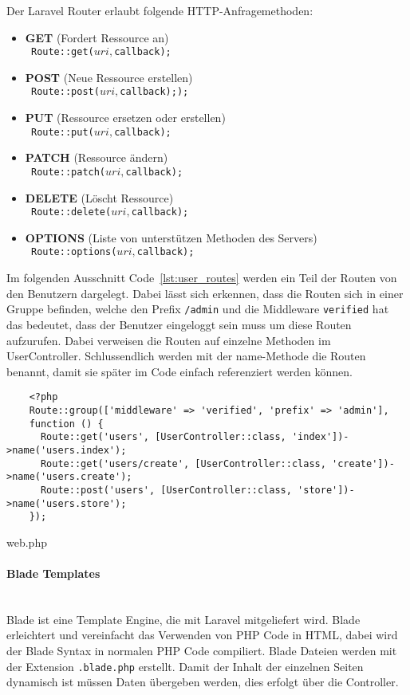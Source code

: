 Der Laravel Router erlaubt folgende HTTP-Anfragemethoden:
\begin{itemize}
  \item \textbf{GET} (Fordert Ressource an)\\
  \texttt{  Route::get($uri, $callback);}
  \item \textbf{POST} (Neue Ressource erstellen)\\
  \texttt{  Route::post($uri, $callback););}
  \item \textbf{PUT} (Ressource ersetzen oder erstellen)\\
  \texttt{  Route::put($uri, $callback);}
  \item \textbf{PATCH} (Ressource ändern)\\
  \texttt{  Route::patch($uri, $callback);}
  \item \textbf{DELETE} (Löscht Ressource)\\
  \texttt{  Route::delete($uri, $callback);}
  \item \textbf{OPTIONS} (Liste von unterstützen Methoden des Servers)\\
  \texttt{  Route::options($uri, $callback);}
\end{itemize}

Im folgenden Ausschnitt Code~\ref{lst:user_routes} werden ein Teil der Routen
von den Benutzern dargelegt. Dabei lässt sich erkennen, dass die Routen sich in
einer Gruppe befinden, welche den Prefix \verb|/admin| und die Middleware
\verb|verified| hat das bedeutet, dass der Benutzer eingeloggt sein muss um
diese Routen aufzurufen. Dabei verweisen die Routen auf einzelne Methoden im
UserController. Schlussendlich werden mit der name-Methode die Routen benannt,
damit sie später im Code einfach referenziert werden können.

\begin{listing}[H]
  \begin{verbatim}
    <?php
    Route::group(['middleware' => 'verified', 'prefix' => 'admin'], 
    function () {
      Route::get('users', [UserController::class, 'index'])->name('users.index');
      Route::get('users/create', [UserController::class, 'create'])->name('users.create');
      Route::post('users', [UserController::class, 'store'])->name('users.store');
    });
  \end{verbatim}
  \caption{web.php}
  \label{lst:user_routes}
\end{listing}

\paragraph{Blade Templates}\mbox{}\\
Blade ist eine Template Engine, die mit Laravel mitgeliefert wird. Blade
erleichtert und vereinfacht das Verwenden von PHP Code in HTML, dabei wird der
Blade Syntax in normalen PHP Code compiliert. Blade Dateien werden mit der
Extension \verb|.blade.php| erstellt. Damit der Inhalt der einzelnen Seiten
dynamisch ist müssen Daten übergeben werden, dies erfolgt über die Controller.\\

